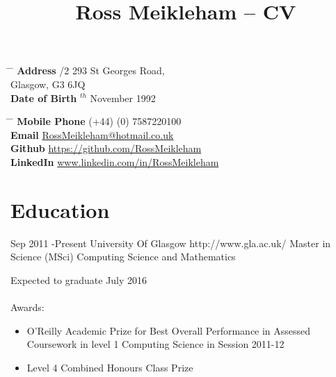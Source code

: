 \documentclass[10pt]{article} %
\begin{document}

\title{Ross Meikleham -- CV} %


\parbox{0.5\textwidth}{ %
\begin{tabbing} %
\hspace{3cm} \= \hspace{4cm} \= \kill %
{\bf Address} /2 293 St Georges Road,\\ %
\> Glasgow, G3 6JQ \\ %
{\bf Date of Birth} $^{th}$ November 1992 \\ %

\end{tabbing}}
\hfill %
\parbox{0.5\textwidth}{ %
\begin{tabbing} %
\hspace{3cm} \= \hspace{4cm} \= \kill %
{\bf Mobile Phone} \> (+44) (0) 7587220100 \\ %
{\bf Email} \> \href{mailto:rossmeikleham@hotmail.co.uk}{RossMeikleham@hotmail.co.uk} \\ %
{\bf Github} \> \href{https://github.com/RossMeikleham}{https://github.com/RossMeikleham} \\ %
{\bf LinkedIn} \> \href{www.linkedin.com/in/RossMeikleham}{www.linkedin.com/in/RossMeikleham} %
\end{tabbing}}
\section{Education}

\job
{Sep 2011 -}{Present}
{University Of Glasgow}
{http://www.gla.ac.uk/}
{Master in Science (MSci) Computing Science and Mathematics}
{Expected to graduate July 2016\\\\
Awards:
\begin{itemize}
\item{O’Reilly Academic Prize for Best Overall Performance in Assessed Coursework in level 1 Computing Science in Session 2011-12}
\item{Level 4 Combined Honours Class Prize}
\end{itemize}}
\end{document}
